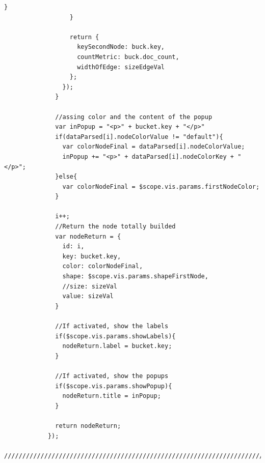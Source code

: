 \documentclass[a4paper, 12pt]{book}
\begin{document}
\begin{lstlisting}[frame=single]
                    }
                  }

                  return {
                    keySecondNode: buck.key,
                    countMetric: buck.doc_count,
                    widthOfEdge: sizeEdgeVal
                  };
                });
              }

              //assing color and the content of the popup
              var inPopup = "<p>" + bucket.key + "</p>"
              if(dataParsed[i].nodeColorValue != "default"){
                var colorNodeFinal = dataParsed[i].nodeColorValue;
                inPopup += "<p>" + dataParsed[i].nodeColorKey + "</p>";
              }else{
                var colorNodeFinal = $scope.vis.params.firstNodeColor;
              }

              i++;
              //Return the node totally builded
              var nodeReturn = {
                id: i,
                key: bucket.key,
                color: colorNodeFinal,
                shape: $scope.vis.params.shapeFirstNode,
                //size: sizeVal
                value: sizeVal
              }

              //If activated, show the labels
              if($scope.vis.params.showLabels){
                nodeReturn.label = bucket.key;
              }

              //If activated, show the popups
              if($scope.vis.params.showPopup){
                nodeReturn.title = inPopup;
              }

              return nodeReturn;
            });
            ////////////////////////////////////////////////////////////////////////////////////////////////////////////


\end{lstlisting}
\end{document}
